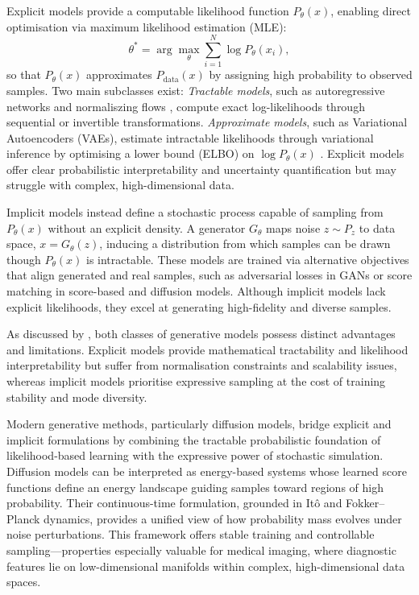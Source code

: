 Explicit models provide a computable likelihood function \(P_\theta(x)\), enabling direct optimisation via maximum likelihood estimation (MLE):
\begin{equation}
    \theta^* = \arg\max_\theta \sum_{i=1}^{N} \log P_\theta(x_i),
\end{equation}
so that \(P_\theta(x)\) approximates \(P_{\text{data}}(x)\) by assigning high probability to observed samples.  
Two main subclasses exist:  
\emph{Tractable models}, such as autoregressive networks \citep{radford2019language} and normaliszing flows \citep{papamakarios2021normalizing}, compute exact log-likelihoods through sequential or invertible transformations.  
\emph{Approximate models}, such as Variational Autoencoders (VAEs), estimate intractable likelihoods through variational inference by optimising a lower bound (ELBO) on \(\log P_\theta(x)\) \citep{kingma2019introduction}.  
Explicit models offer clear probabilistic interpretability and uncertainty quantification but may struggle with complex, high-dimensional data.

Implicit models instead define a stochastic process capable of sampling from \(P_\theta(x)\) without an explicit density.  
A generator \(G_\theta\) maps noise \(z \sim P_z\) to data space, \(x = G_\theta(z)\), inducing a distribution from which samples can be drawn though \(P_\theta(x)\) is intractable.  
These models are trained via alternative objectives that align generated and real samples, such as adversarial losses in GANs or score matching in score-based and diffusion models.
Although implicit models lack explicit likelihoods, they excel at generating high-fidelity and diverse samples.

As discussed by \citet{NEURIPS2021_5db60c98}, both classes of generative models possess distinct advantages and limitations.  
Explicit models provide mathematical tractability and likelihood interpretability but suffer from normalisation constraints and scalability issues, whereas implicit models prioritise expressive sampling at the cost of training stability and mode diversity.  

Modern generative methods, particularly diffusion models, bridge explicit and implicit formulations by combining the tractable probabilistic foundation of likelihood-based learning with the expressive power of stochastic simulation.  
Diffusion models can be interpreted as energy-based systems whose learned score functions define an energy landscape guiding samples toward regions of high probability.  
Their continuous-time formulation, grounded in Itô and Fokker–Planck dynamics, provides a unified view of how probability mass evolves under noise perturbations.  
This framework offers stable training and controllable sampling—properties especially valuable for medical imaging, where diagnostic features lie on low-dimensional manifolds within complex, high-dimensional data spaces.


